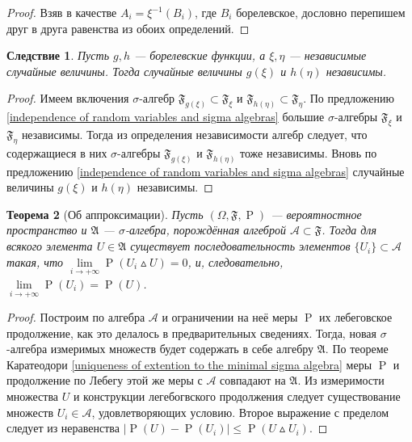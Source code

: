 \documentclass[12pt]{article}
\newtheorem{theorem}{Теорема}
\newtheorem{corollary}[theorem]{Следствие}
\numberwithin{theorem}{section}
\theoremstyle{definition}
\newcommand{\calA}{\mathcal{A}}
\newcommand{\setsigmaalg}{\mathfrak{A}}
\newcommand{\prob}{\operatorname{P}}
\newcommand{\events}{\mathfrak{F}}
\begin{document}
	\begin{proof}
		Взяв в качестве $ A_i = \xi^{-1}(B_i) $, где $ B_i $ борелевское, дословно перепишем друг в друга равенства из обоих определений.
	\end{proof}
	
	\begin{corollary} \label{independence of compositions}
		Пусть $ g, h $ --- борелевские функции, а $ \xi, \eta $ --- независимые случайные величины.
		Тогда случайные величины $ g(\xi) $ и $ h(\eta) $ независимы.
	\end{corollary}
	
	\begin{proof}
		Имеем включения $ \sigma $-алгебр $ \events_{g(\xi)} \subset \events_{\xi} $
		и $ \events_{h(\eta)} \subset \events_{\eta} $.
		По предложению \ref{independence of random variables and sigma algebras} большие
		$ \sigma $-алгебры $ \events_{\xi} $ и $ \events_{\eta} $ независимы.
		Тогда из определения независимости алгебр следует, что содержащиеся в них
		$ \sigma $-алгебры $ \events_{g(\xi)} $ и $ \events_{h(\eta)} $ тоже независимы.
		Вновь по предложению \ref{independence of random variables and sigma algebras}
		случайные величины $ g(\xi) $ и $ h(\eta) $ независимы.
	\end{proof}
	
	\begin{theorem}[Об аппроксимации] \label{approximation}
		Пусть $ (\Omega, \events, \prob) $ --- вероятностное пространство
		и $ \setsigmaalg $ --- $ \sigma $-алгебра, порождённая алгеброй $ \calA \subset \events $.
		Тогда для всякого элемента $ U \in \setsigmaalg $ существует последовательность
		элементов $ \{U_i\} \subset \calA $ такая, что $ \lim\limits_{i \to +\infty} \prob(U_i \vartriangle U) = 0 $,
		и, следовательно, $ \lim\limits_{i \to +\infty}{\prob(U_i)} = \prob(U) $.
	\end{theorem}
	
	\begin{proof}
		Построим по алгебра $ \calA $ и ограничении на неё меры $ \prob $ их лебеговское продолжение,
		как это делалось в предварительных сведениях.
		Тогда, новая $ \sigma $-алгебра измеримых множеств будет содержать в себе алгебру $ \setsigmaalg $.
		По теореме Каратеодори \ref{uniqueness of extention to the minimal sigma algebra} 
		меры $ \prob $ и продолжение по Лебегу этой же меры с $ \calA $ совпадают на $ \setsigmaalg $.
		Из измеримости множества $ U $ и конструкции легебогвского продолжения следует существование
		множеств $ U_i \in \calA $, удовлетворяющих условию.
		Второе выражение с пределом следует из неравенства $ |\prob(U) - \prob(U_i)| \leqslant \prob(U \vartriangle U_i) $.
	\end{proof}
	
\end{document}

